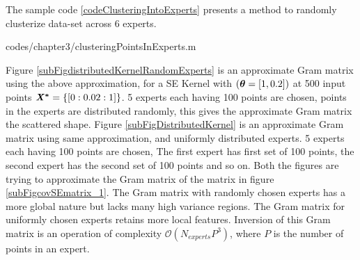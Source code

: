 The sample code \ref{codeClusteringIntoExperts} presents a method to randomly clusterize data-set across $6$ experts.
\begin{mdframed}[hidealllines=true,backgroundcolor=lightgray!20]

                    {codes/chapter3/clusteringPointsInExperts.m}
\end{mdframed}

Figure \ref{subFigdistributedKernelRandomExperts} is an approximate Gram matrix using the above approximation, for a SE Kernel with $(\boldsymbol{\theta} = [1, 0.2])$ at 500 input points $\bm{\mathit{X^{*}}} = \{[0:0.02:1]\}$. 5 experts each having 100 points are chosen, points in the experts are distributed randomly, this gives the approximate Gram matrix the scattered shape. Figure \ref{subFigDistributedKernel} is an approximate Gram matrix using same approximation, and uniformly distributed experts. 5 experts each having 100 points are chosen, The first expert has first set of 100 points, the second expert has the second set of 100 points and so on. Both the figures are trying to approximate the Gram matrix of the matrix in figure \ref{subFigcovSEmatrix_1}. The Gram matrix with randomly chosen experts has a more global nature but lacks many high variance regions. The Gram matrix for uniformly chosen experts retains more local features. Inversion of this Gram matrix is an operation of complexity $\mathcal{O}(N_{experts}P^{3})$, where $P$ is the number of points in an expert.

